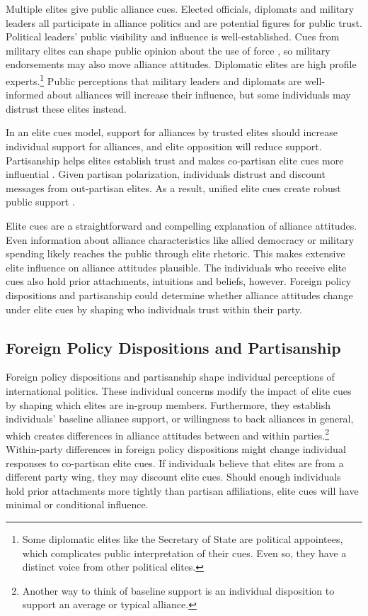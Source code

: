 \documentclass[12pt]{article}
\begin{document}
Multiple elites give public alliance cues.
Elected officials, diplomats and military leaders all participate in alliance politics and are potential figures for public trust.
Political leaders' public visibility and influence is well-established.
Cues from military elites can shape public opinion about the use of force \citep{Golbyetal2018}, so military endorsements may also move alliance attitudes. 
Diplomatic elites are high profile experts.\footnote{Some diplomatic elites like the Secretary of State are political appointees, which complicates public interpretation of their cues. Even so, they have a distinct voice from other political elites.}
Public perceptions that military leaders and diplomats are well-informed about alliances will increase their influence, but some individuals may distrust these elites instead.


In an elite cues model, support for alliances by trusted elites should increase individual support for alliances, and elite opposition will reduce support.   
Partisanship helps elites establish trust and makes co-partisan elite cues more influential \citep{Druckmanetal2013}.
Given partisan polarization, individuals distrust and discount messages from out-partisan elites.
As a result, unified elite cues create robust public support \citep{Berinsky2007}.


Elite cues are a straightforward and compelling explanation of alliance attitudes.
Even information about alliance characteristics like allied democracy or military spending likely reaches the public through elite rhetoric. 
This makes extensive elite influence on alliance attitudes plausible. 
The individuals who receive elite cues also hold prior attachments, intuitions and beliefs, however.
Foreign policy dispositions and partisanship could determine whether alliance attitudes change under elite cues by shaping who individuals trust within their party.


\subsection{Foreign Policy Dispositions and Partisanship}


Foreign policy dispositions and partisanship shape individual perceptions of international politics. 
These individual concerns modify the impact of elite cues by shaping which elites are in-group members.
Furthermore, they establish individuals' baseline alliance support, or willingness to back alliances in general, which creates differences in alliance attitudes between and within parties.\footnote{Another way to think of baseline support is an individual disposition to support an average or typical alliance.}
Within-party differences in foreign policy dispositions might change individual responses to co-partisan elite cues.
If individuals believe that elites are from a different party wing, they may discount elite cues.  
Should enough individuals hold prior attachments more tightly than partisan affiliations, elite cues will have minimal or conditional influence.
\end{document}
